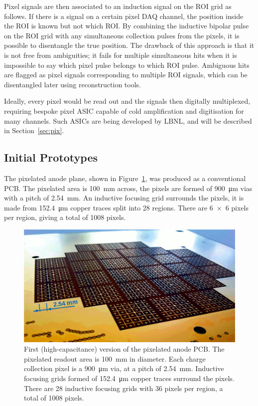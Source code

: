 \documentclass[a4paper]{article}
\begin{document}
Pixel signals are then associated to an induction signal on the ROI grid as follows. 
If there is a signal on a certain pixel DAQ channel, the position inside the ROI is known but not which ROI.
By combining the inductive bipolar pulse on the ROI grid with any simultaneous collection pulses from the pixels, it is possible to disentangle the true position.
The drawback of this approach is that it is not free from ambiguities; it fails for multiple simultaneous hits when it is impossible to say which pixel pulse belongs to which ROI pulse.
Ambiguous hits are flagged as pixel signals corresponding to multiple ROI signals, which can be disentangled later using reconstruction tools.
 
Ideally, every pixel would be read out and the signals then digitally multiplexed, requiring bespoke pixel ASIC capable of cold amplification and digitisation for many channels.
Such ASICs are being developed by LBNL, and will be described in Section~\ref{sec:pix}.

\subsection{Initial Prototypes}

The pixelated anode plane, shown in Figure~\ref{fig:viper_pixies}, was produced as a conventional PCB.
The pixelated area is \SI{100}{\milli\metre} across, the pixels are formed of \SI{900}{\micro\metre} vias with a pitch of \SI{2.54}{\milli\metre}.
An inductive focusing grid surrounds the pixels, it is made from \SI{152.4}{\micro\metre} copper traces split into 28 regions.
There are \num{6 x 6} pixels per region, giving a total of 1008 pixels. 

\begin{figure}[tbp]
	\centering
	\includegraphics[width=\textwidth]{Figures/pixies}
	\caption[Pixel demonstrator readout plane]{%
		First (high-capacitance) version of the pixelated anode PCB.
		The pixelated readout area is \SI{100}{\milli\metre} in diameter.
		Each charge collection pixel is a \SI{900}{\micro\metre} via, at a pitch of \SI{2.54}{\milli\metre}.
		Inductive focusing grids formed of \SI{152.4}{\micro\metre} copper traces surround the pixels.
		There are \num{28} inductive focusing grids with \num{36} pixels per region, a total of \num{1008} pixels.
	}
	\label{fig:viper_pixies}
\end{figure}
\end{document}
